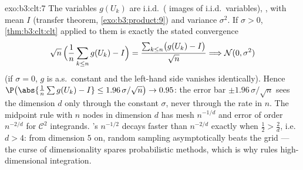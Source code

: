 \begin{solution}{exo:b3:clt:7}
The variables $g(U_k)$ are i.i.d.\ ( images of
i.i.d.\ variables), , with mean $I$
(transfer theorem, \cref{exo:b3:product:9}) and variance
$\sigma^2$. If $\sigma > 0$, \cref{thm:b3:clt:clt} applied
to them is exactly the stated convergence
\[
\sqrt n\,\Bigl(\frac1n\sum_{k\leq n}g(U_k) - I\Bigr) =
\frac{\sum_{k\leq n}\bigl(g(U_k) - I\bigr)}{\sqrt n}
\Longrightarrow \mathcal N(0, \sigma^2)
\]
(if $\sigma = 0$, $g$ is a.s.\ constant and the left-hand
side vanishes identically). Hence
$\P\bigl(\abs{\frac1n\sum g(U_k) - I} \leq
1.96\,\sigma/\sqrt n\bigr) \to 0.95$: the error bar $\pm
1.96\,\sigma/\sqrt n$ sees the dimension $d$ only through
the constant $\sigma$, never through the rate in $n$. The
midpoint rule with $n$ nodes in dimension $d$ has mesh
$n^{-1/d}$ and error of order $n^{-2/d}$ for $\mathcal C^2$
integrands. 's $n^{-1/2}$ decays faster than
$n^{-2/d}$ exactly when $\frac12 > \frac2d$, i.e.\ $d > 4$:
from dimension $5$ on, random sampling asymptotically beats
the grid --- the curse of dimensionality spares
probabilistic methods, which is why  rules
high-dimensional integration.
\end{solution}

